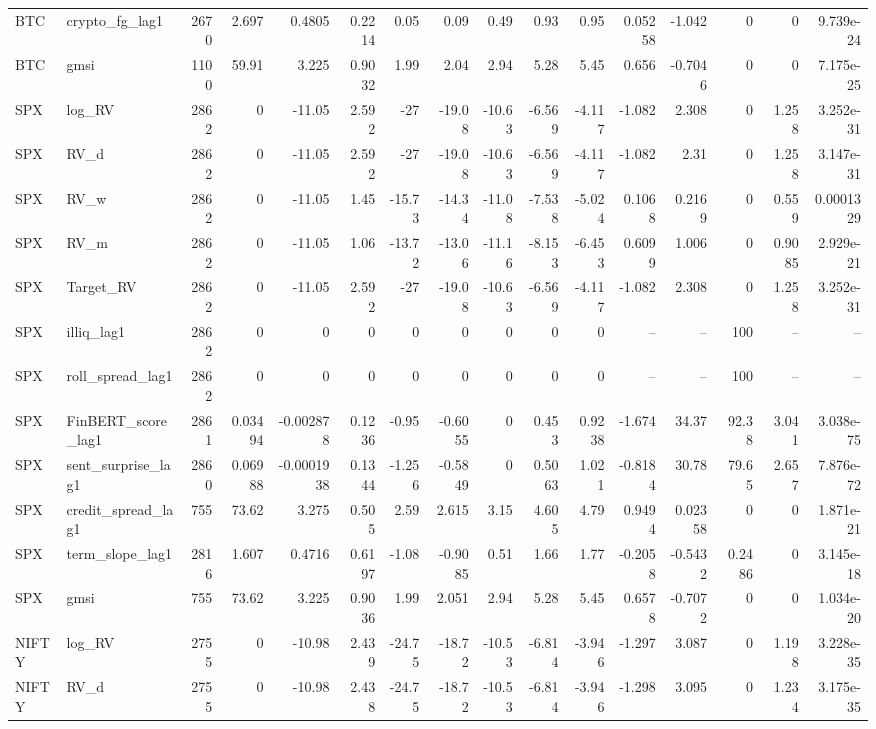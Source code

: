 \begin{table}[htbp]
\begin{tabular}{llrrrrrrrrrrrrrr}
BTC & crypto\_fg\_lag1 & 2670 & 2.697 & 0.4805 & 0.2214 & 0.05 & 0.09 & 0.49 & 0.93 & 0.95 & 0.05258 & -1.042 & 0 & 0 & 9.739e-24 \\
BTC & gmsi & 1100 & 59.91 & 3.225 & 0.9032 & 1.99 & 2.04 & 2.94 & 5.28 & 5.45 & 0.656 & -0.7046 & 0 & 0 & 7.175e-25 \\
SPX & log\_RV & 2862 & 0 & -11.05 & 2.592 & -27 & -19.08 & -10.63 & -6.569 & -4.117 & -1.082 & 2.308 & 0 & 1.258 & 3.252e-31 \\
SPX & RV\_d & 2862 & 0 & -11.05 & 2.592 & -27 & -19.08 & -10.63 & -6.569 & -4.117 & -1.082 & 2.31 & 0 & 1.258 & 3.147e-31 \\
SPX & RV\_w & 2862 & 0 & -11.05 & 1.45 & -15.73 & -14.34 & -11.08 & -7.538 & -5.024 & 0.1068 & 0.2169 & 0 & 0.559 & 0.0001329 \\
SPX & RV\_m & 2862 & 0 & -11.05 & 1.06 & -13.72 & -13.06 & -11.16 & -8.153 & -6.453 & 0.6099 & 1.006 & 0 & 0.9085 & 2.929e-21 \\
SPX & Target\_RV & 2862 & 0 & -11.05 & 2.592 & -27 & -19.08 & -10.63 & -6.569 & -4.117 & -1.082 & 2.308 & 0 & 1.258 & 3.252e-31 \\
SPX & illiq\_lag1 & 2862 & 0 & 0 & 0 & 0 & 0 & 0 & 0 & 0 & -- & -- & 100 & -- & -- \\
SPX & roll\_spread\_lag1 & 2862 & 0 & 0 & 0 & 0 & 0 & 0 & 0 & 0 & -- & -- & 100 & -- & -- \\
SPX & FinBERT\_score\_lag1 & 2861 & 0.03494 & -0.002878 & 0.1236 & -0.95 & -0.6055 & 0 & 0.453 & 0.9238 & -1.674 & 34.37 & 92.38 & 3.041 & 3.038e-75 \\
SPX & sent\_surprise\_lag1 & 2860 & 0.06988 & -0.0001938 & 0.1344 & -1.256 & -0.5849 & 0 & 0.5063 & 1.021 & -0.8184 & 30.78 & 79.65 & 2.657 & 7.876e-72 \\
SPX & credit\_spread\_lag1 & 755 & 73.62 & 3.275 & 0.505 & 2.59 & 2.615 & 3.15 & 4.605 & 4.79 & 0.9494 & 0.02358 & 0 & 0 & 1.871e-21 \\
SPX & term\_slope\_lag1 & 2816 & 1.607 & 0.4716 & 0.6197 & -1.08 & -0.9085 & 0.51 & 1.66 & 1.77 & -0.2058 & -0.5432 & 0.2486 & 0 & 3.145e-18 \\
SPX & gmsi & 755 & 73.62 & 3.225 & 0.9036 & 1.99 & 2.051 & 2.94 & 5.28 & 5.45 & 0.6578 & -0.7072 & 0 & 0 & 1.034e-20 \\
NIFTY & log\_RV & 2755 & 0 & -10.98 & 2.439 & -24.75 & -18.72 & -10.53 & -6.814 & -3.946 & -1.297 & 3.087 & 0 & 1.198 & 3.228e-35 \\
NIFTY & RV\_d & 2755 & 0 & -10.98 & 2.438 & -24.75 & -18.72 & -10.53 & -6.814 & -3.946 & -1.298 & 3.095 & 0 & 1.234 & 3.175e-35 \\

\end{tabular}
\end{table}
